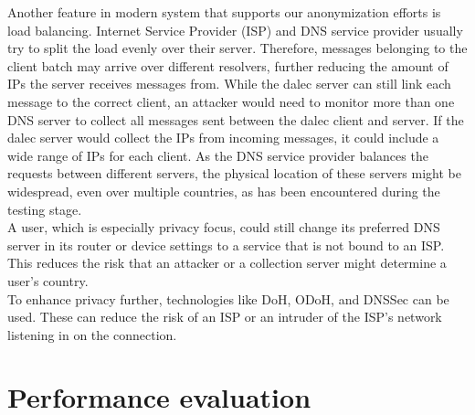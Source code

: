     Another feature in modern system that supports our anonymization efforts is load balancing. Internet Service Provider (ISP) and DNS service provider usually try to split the load evenly over their server. Therefore, messages belonging to the client batch may arrive over different resolvers, further reducing the amount of IPs the server receives messages from. While the dalec server can still link each message to the correct client, an attacker would need to monitor more than one DNS server to collect all messages sent between the dalec client and server. If the dalec server would collect the IPs from incoming messages, it could include a wide range of IPs for each client. As the DNS service provider balances the requests between different servers, the physical location of these servers might be widespread, even over multiple countries, as has been encountered during the testing stage.\\
    
    A user, which is especially privacy focus, could still change its preferred DNS server in its router or device settings to a service that is not bound to an ISP. This reduces the risk that an attacker or a collection server might determine a user's country.\\
    To enhance privacy further, technologies like DoH, ODoH, and DNSSec can be used. These can reduce the risk of an ISP or an intruder of the ISP's network listening in on the connection. 




\section{Performance evaluation}
\label{sec:results:telemetry}
%
    

